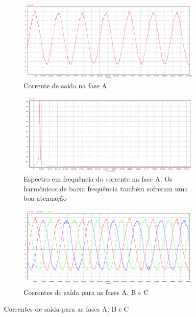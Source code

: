 \begin{figure}[!hbt]
	\centering
	\begin{subfigure}[b]{0.5\textwidth}
		\centering
		\includegraphics[width=\textwidth]{figuras/sim_figures/inversor_e_boost/corrente_ia.PNG}
		\caption{Corrente de saída na fase A}
    \end{subfigure}

    \begin{subfigure}[b]{0.5\textwidth}
		\centering
		\includegraphics[width=\textwidth]{figuras/sim_figures/inversor_e_boost/corrente_ia_espectro.PNG}
		\caption{Espectro em frequência da corrente na fase A. Os harmônicos de baixa frequência também sofreram uma boa atenuação}
    \end{subfigure}

	\begin{subfigure}[b]{0.5\textwidth}
		\includegraphics[width=\textwidth]{figuras/sim_figures/inversor_e_boost/corrente_ia_ib_ic.PNG}
		\caption{Correntes de saída para as fases A, B e C}
	\end{subfigure}


\end{figure}
